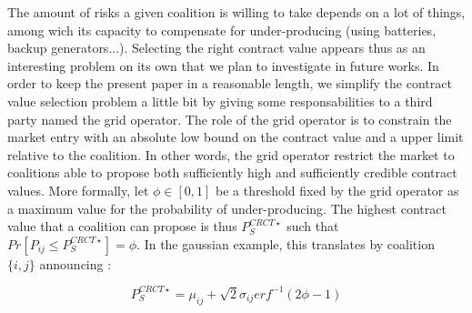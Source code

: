 \documentclass[conference]{IEEEtran}
\begin{document}
The amount of risks a given coalition is willing to take depends on a lot of things, among wich its capacity to compensate for under-producing (using batteries, backup generators...). Selecting the right contract value appears thus as an interesting problem on its own that we plan to investigate in future works. In order to keep the present paper in a reasonable length, we simplify the contract value selection problem a little bit by giving some responsabilities to a third party named the grid operator. The role of the grid operator is to constrain the market entry with an absolute low bound on the contract value and a upper limit relative to the coalition. In other words, the grid operator restrict the market to coalitions able to propose both sufficiently high and sufficiently credible contract values. More formally, let $ \phi \in [0,1] $ be a threshold fixed by the grid operator as a maximum value for the probability of under-producing. The highest contract value that a coalition can propose is thus $ P_{S}^{CRCT \star} $ such that $ Pr[P_{ij} \leq P_{S}^{CRCT \star}] = \phi $. In the gaussian example, this translates by coalition $ \{i,j\}$ announcing :

\begin{equation}
\label{eq:P_star}
P_{S}^{CRCT \star} = \mu_{ij} + \sqrt{2} \sigma_{ij} erf^{-1}(2 \phi - 1 )
\end{equation}
\end{document}
